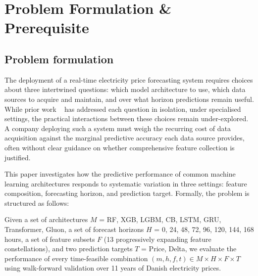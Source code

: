 \section{Problem Formulation \& 
Prerequisite} 
\label{sec:problem-formulation-and-approach}
\subsection{Problem formulation}
The deployment of a real-time electricity price forecasting
system requires choices about three intertwined questions:
which model architecture to use, which data sources to acquire
and maintain, and over what horizon predictions remain useful.
While prior work ~\cite{energyPricePredictionMLNeighbors, 
energyPricePredictionUK, energyPricePredictionNovelDeepLearning} has addressed 
each question in isolation, under specialised 
settings, the practical 
interactions between these choices remain under-explored. A company
deploying such a system must weigh the recurring cost of
data acquisition against the marginal predictive accuracy each
data source provides, often without clear guidance on whether
comprehensive feature collection is justified.

This paper investigates how the predictive performance of
common machine learning architectures responds to 
systematic
variation in three settings: feature composition, forecasting
horizon, and prediction target. Formally, the problem is
structured as follows:

Given a set of architectures $M$ = RF, XGB, LGBM, CB,
LSTM, GRU, Transformer, Gluon, a set of forecast horizons
$H$ = 0, 24, 48, 72, 96, 120, 144, 168 hours, a set of feature
subsets $F$ (13 progressively expanding feature constellations),
and two prediction targets $T$ = Price, Delta, we evaluate the
performance of every time-feasible combination $(m, h, f, t) \in
M \times H \times F \times T$ using walk-forward validation over 11 years
of Danish electricity prices.

